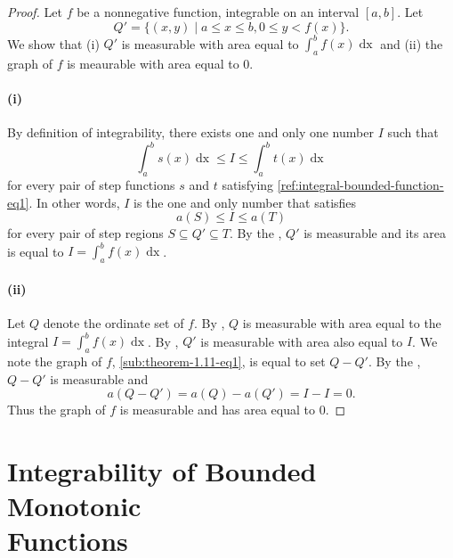 \documentclass{report}
\begin{document}
  \begin{proof}

    Let $f$ be a nonnegative function, integrable on an interval $[a, b]$.
    Let $$Q' = \{(x, y) \mid a \leq x \leq b, 0 \leq y < f(x)\}.$$
    We show that (i) $Q'$ is measurable with area equal to
      $\int_a^b f(x) \mathop{dx}$ and (ii) the graph of $f$ is meaurable with
      area equal to $0$.

    \paragraph{(i)}%

      By definition of integrability, there exists one and only one number $I$
        such that
        $$\int_a^b s(x) \mathop{dx} \leq I \leq \int_a^b t(x) \mathop{dx}$$
        for every pair of step functions $s$ and $t$ satisfying
        \eqref{ref:integral-bounded-function-eq1}.
      In other words, $I$ is the one and only number that satisfies
        $$a(S) \leq I \leq a(T)$$ for every pair of step regions
        $S \subseteq Q' \subseteq T$.
      By the , $Q'$ is measurable and its
        area is equal to $I = \int_a^b f(x) \mathop{dx}$.

    \paragraph{(ii)}%

      Let $Q$ denote the ordinate set of $f$.
      By , $Q$ is measurable with area equal to the
        integral $I = \int_a^b f(x) \mathop{dx}$.
      By , $Q'$ is
        measurable with area also equal to $I$.
      We note the graph of $f$, \eqref{sub:theorem-1.11-eq1}, is equal to set
        $Q - Q'$.
      By the , $Q - Q'$ is measurable and
        $$a(Q - Q') = a(Q) - a(Q') = I - I = 0.$$
      Thus the graph of $f$ is measurable and has area equal to $0$.

  \end{proof}

\section
  [Integrability of Bounded Monotonic Functions]
  {Integrability of Bounded Monotonic \texorpdfstring{\\}{}Functions}
\end{document}
